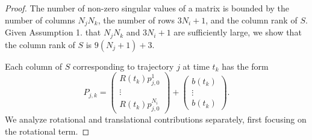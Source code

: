 \documentclass[10pt,a4paper]{amsart}
\begin{document}
\begin{proof}
    The number of non-zero singular values of a matrix is bounded by the number of columns $N_jN_k$, the number of rows $3N_i+1$, and the column rank of $S$. Given Assumption 1. that $N_jN_k$ and $3N_i+1$ are sufficiently large, we show that the column rank of $S$ is $9(N_j+1)+3$.
    
    Each column of $S$ corresponding to trajectory $j$ at time $t_k$ has the form
    \begin{equation}
    P_{j,k}     =
    \begin{pmatrix}
    R(t_k)p^1_{j,0} \\ 
    \vdots \\
    R(t_k)p^{N_i}_{j,0}
    \end{pmatrix}
    +
    \begin{pmatrix}
    b(t_k) \\
    \vdots \\
    b(t_k)
    \end{pmatrix}.
    \end{equation}
    We analyze rotational and translational contributions separately, first focusing on the rotational term.


\end{proof}
\end{document}
